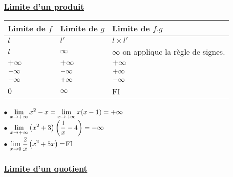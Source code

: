 \subsubsection*{\underline{Limite d'un produit}}
\begin{tabularx}{\textwidth}{|X|X|X|}
\hline
Limite de $ f $ & Limite de $ g $ &Limite de $ f.g $ \\
\hline
$ l $& $ l' $&$ l\times l' $ \\
\hline
 $ l $& $ \infty$& $ \infty $  \scriptsize{on applique la règle de signes.}\\
\hline
$ +\infty $& $ +\infty $& $ +\infty $\\
\hline
$ -\infty $& $ -\infty $& $ +\infty $\\
\hline
$ -\infty $& $ +\infty $&$ -\infty $ \\
\hline

$ 0 $& $ \infty $& FI\\
\hline
\end{tabularx}
\begin{example}


$ \bullet $  \; $ \displaystyle \lim_{x\to +\infty}x^{2}-x= \displaystyle \lim_{x\to +\infty}x(x-1)=+\infty $\\
$ \bullet $  \; $ \displaystyle \lim_{x\to +\infty}\left(x^{2}+3\right)\left(\frac{1}{x}-4\right) =-\infty$\\
$\bullet $  \; $ \displaystyle \lim_{x\to 0}\frac{2}{x} \left(x^{2}+5x\right) =$FI
\end{example}

\subsubsection*{\underline{Limite d'un quotient}}

